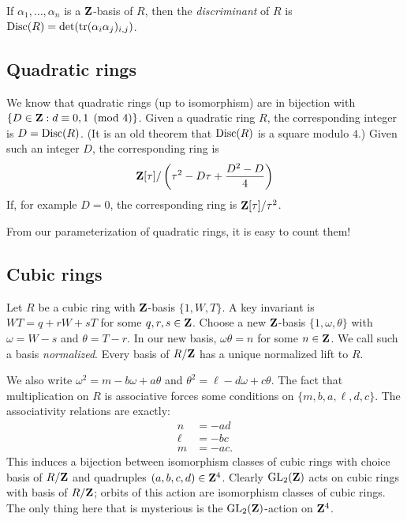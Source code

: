 If $\alpha_1,\dots,\alpha_n$ is a $\mathbf{Z}$-basis of $R$, then the 
\emph{discriminant} of $R$ is 
$\operatorname{Disc}(R) = \det(\operatorname{tr}(\alpha_i \alpha_j)_{i,j})$. 





\subsection{Quadratic rings}

We know that quadratic rings (up to isomorphism) are in bijection with 
$\{D\in \mathbf{Z}:d\equiv 0,1\pmod 4\}$. Given a quadratic ring $R$, the 
corresponding integer is $D=\operatorname{Disc}(R)$. (It is an old theorem that 
$\operatorname{Disc}(R)$ is a square modulo $4$.) Given such an integer $D$, 
the corresponding ring is 
\[
  \mathbf{Z}[\tau]/\left(\tau^2 - D\tau + \frac{D^2-D}{4}\right)
\]
If, for example $D=0$, the corresponding ring is $\mathbf{Z}[\tau]/\tau^2$. 

From our parameterization of quadratic rings, it is easy to count them! 





\subsection{Cubic rings}

Let $R$ be a cubic ring with $\mathbf{Z}$-basis $\{1,W,T\}$. A key invariant is 
$W T = q+r W + s T$ for some $q,r,s\in \mathbf{Z}$. Choose a new 
$\mathbf{Z}$-basis $\{1,\omega,\theta\}$ with $\omega=W-s$ and $\theta=T-r$. In our 
new basis, $\omega\theta = n$ for some $n\in \mathbf{Z}$. We call such a basis 
\emph{normalized}. Every basis of $R/\mathbf{Z}$ has a unique normalized lift to 
$R$. 

We also write $\omega^2=m-b \omega + a\theta$ and 
$\theta^2 = \ell-d\omega+c\theta$. The fact that multiplication on $R$ is 
associative forces some conditions on $\{m,b,a,\ell,d,c\}$. The 
associativity relations are exactly: 
\begin{align*}
  n &= - a d \\
  \ell &= - b c \\
  m &= - a c .
\end{align*}
This induces a bijection between isomorphism classes of cubic rings with 
choice basis of $R/\mathbf{Z}$ and quadruples $(a,b,c,d)\in \mathbf{Z}^4$. Clearly 
$\operatorname{GL}_2(\mathbf{Z})$ acts on cubic rings with basis of $R/\mathbf{Z}$; orbits of 
this action are isomorphism classes of cubic rings. The only thing here that 
is mysterious is the $\operatorname{GL}_2(\mathbf{Z})$-action on $\mathbf{Z}^4$. 

